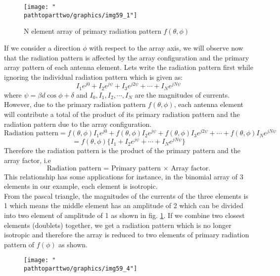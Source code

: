 \begin{figure}[h]
\centering
\texttt{[image: "\\pathtoparttwo/graphics/img59\_1"]}
\caption{N element array of primary radiation pattern $f(\theta, \phi)$}
\label{fig:fig-2}
\end{figure}
If we consider a direction $\phi$ with respect to the array axis, we will observe now that the radiation pattern is affected by the array configuration and the primary array pattern of each antenna element. Lets write the radiation pattern first while ignoring the individual radiation pattern which is given as: 
$$I_1 e^{j0} + I_2 e^{j\psi} + I_3 e^{j2\psi} + \cdots + I_N e^{jN\psi}$$
where $\psi = \beta d\cos\phi + \delta$ and $I_0, I_1, I_2, \cdots, I_N$ are the magnitudes of currents. However, due to the primary radiation pattern $f(\theta, \phi)$, each antenna element will contribute a total of the product of its primary radiation pattern and the radiation pattern due to the array configuration.
\begin{dmath*}
\text{Radiation pattern} = f(\theta, \phi)I_1 e^{j0} + f(\theta, \phi)I_2 e^{j\psi} + f(\theta, \phi)I_3 e^{j2\psi} + \cdots + f(\theta, \phi)I_N e^{jN\psi} 
\end{dmath*}
$$= f(\theta, \phi)\{I_1 + I_2 e^{j\psi}  + \cdots + I_N e^{jN\psi}\}$$
Therefore the radiation pattern is the product of the primary pattern and the array factor, i.e
\begin{equation}
\text{Radiation pattern = Primary pattern $\times$ Array factor.}
\label{eqn53}
\end{equation}
This relationship has some applications for instance, in the binomial array of 3 elements in our example, each element is isotropic.\\
From the pascal triangle, the magnitudes of the currents of the three elements is 1   which means the middle element has an amplitude of 2 which can be divided into two element of amplitude of 1 as shown in fig. \ref{fig:fig-2}. If we combine two closest elements (doublets) together, we get a radiation pattern which is no longer isotropic and therefore the array is reduced to two elements of primary radiation pattern of $f(\phi)$ as shown.
\begin{figure}[h]
\centering
\texttt{[image: "\\pathtoparttwo/graphics/img59\_4"]}
\caption{}
\label{fig:fig-3}
\end{figure}

